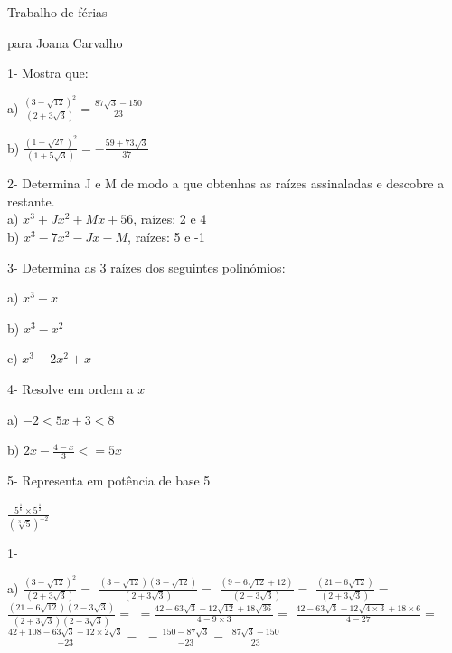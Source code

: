 \documentclass[11pt]{article}
\begin{document}
\begin{center}
{\huge Trabalho de férias}
\end{center}
\begin{center}
{\huge para Joana Carvalho}
\end{center}
\vspace{10mm}

{\large 1- Mostra que:}
\begin{multicols}{2}
a) $ \frac {(3 - \sqrt{12})^{2} }  {(2 + 3 \sqrt{3} )}= \frac{87 \sqrt{3} - 150}{23}$

b) $ \frac {(1 + \sqrt{27})^{2} }  {(1 + 5 \sqrt{3} )}= -\frac{59 + 73 \sqrt{3}}{37}$\\
\end{multicols}
\vspace{5mm}

{\large 2- Determina J e M de modo a que obtenhas as raízes assinaladas e descobre a restante.}\\

a) $x^{3}+Jx^{2} + Mx+56$, raízes: 2 e 4\\

b) $x^3-7x^2-Jx-M$, raízes: 5 e -1\\
\vspace{5mm}

{\large 3- Determina as 3 raízes dos seguintes polinómios:}
\begin{multicols}{3}
a) $x^3-x$

b) $x^3-x^2$

c) $x^3-2x^2+x$
\end{multicols}
\vspace{5mm}

{\large 4- Resolve em ordem a $x$}
\begin{multicols}{2}
a) $-2<5x+3<8$

b) $2x-\frac{4-x}{3}<=5x$
\end{multicols}
\vspace{5mm}

{\large 5- Representa em potência de base 5}

\vspace{5mm}
\begin{center} 
{\large $\frac{5^{\frac{1}{6}}\times5^{\frac{1}{2}}}{(\sqrt[3]{5})^{-2}}$}
\end{center}

\break
{\large 1-}

\vspace{5mm}
a)\hspace{5mm} $ \frac {(3 - \sqrt{12})^{2} }  {(2 + 3 \sqrt{3} )}=$
   $ \frac{(3-\sqrt{12})(3-\sqrt{12})}{(2+3\sqrt{3})}=$
   $ \frac{(9-6\sqrt{12}+12)}{(2+3\sqrt{3})}=$
   $ \frac{(21-6\sqrt{12})}{(2+3\sqrt{3})}=$
   $ \frac{(21-6\sqrt{12})(2-3\sqrt{3})}{(2+3\sqrt{3})(2-3\sqrt{3})}=$
   $= \frac{42-63\sqrt{3}-12\sqrt{12}+18\sqrt{36}}{4-9\times3}=$
   $ \frac{42-63\sqrt{3}-12\sqrt{4\times3}+18\times6}{4-27}=$
   $ \frac{42+108-63\sqrt{3}-12\times2\sqrt{3}}{-23}=$
   $= \frac{150-87\sqrt{3}}{-23}=$
   $\frac{87 \sqrt{3} - 150}{23}$ 
\end{document}
